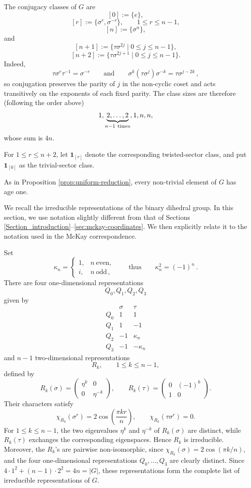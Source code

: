 \documentclass[a4paper,reqno]{amsart}
\theoremstyle{plain} %
\theoremstyle{definition} %
\theoremstyle{remark} %
\newcommand{\ka}{{\kappa}}
\newcommand{\1}{\mathds{1}}   %
\begin{document}
The conjugacy classes of \(G\) are
\[
[0]:=\{e\},
\]
\[
[r]:=\{\sigma^r,\sigma^{-r}\},
\qquad
1\le r\le n-1,
\]
\[
[n]:=\{\sigma^n\},
\]
and
\[
[n+1]
:=
\{\tau\sigma^{2j}\mid 0\le j\le n-1\},
\]
\[
[n+2]
:=
\{\tau\sigma^{2j+1}\mid 0\le j\le n-1\}.
\]
Indeed,
\[
\tau\sigma^r\tau^{-1}=\sigma^{-r}  \qquad \mbox{and} \qquad \sigma^k(\tau\sigma^j)\sigma^{-k}= \tau\sigma^{j-2k} \, ,
\]
so conjugation preserves the parity of \(j\) in the non-cyclic
coset and acts transitively on the exponents of each fixed
parity. The class sizes are therefore (following the  order above)
\[
1,\underbrace{2,\ldots,2}_{n-1\ {\rm times}},1,n,n,
\]
whose sum is \(4n\).

For \(1\le r\le n+2\), let $\mathbf1_{[r]}$ denote the corresponding twisted-sector class, and put $\mathbf1_{[0]}$ as the trivial-sector class.

As in Proposition \ref{prop:uniform-reduction}, every non-trivial element of \(G\) has age one.

We recall the irreducible representations of the binary
dihedral group.
In this section, we use notation slightly different from that of Sections \ref{Section_introduction}--\ref{sec:mckay-coordinates}. 
We then explicitly relate it to the notation used in the McKay correspondence.


Set
\begin{equation}\label{kn}
\ka_n
=
\begin{cases}
1,& n\ \text{even},\\
i,& n\ \text{odd} \, ,
\end{cases}
\qquad \mbox{thus} \qquad \ka_n^2 =(-1)^{n}\, .
\end{equation}
There are four one-dimensional representations
\[
Q_0, Q_1, Q_2, Q_3
\]
given by
\[
\begin{array}{c|cc}
 &\sigma&\tau\\
\hline
Q_0&1&1\\
Q_1&1&-1\\
Q_2&-1&\ka_n\\
Q_3&-1&-\ka_n
\end{array}
\]
and \(n-1\) two-dimensional representations
\[
R_k,
\qquad
1\le k\le n-1,
\]
defined by
\[
R_k(\sigma)
=
\begin{pmatrix}
\eta^{k}&0\\
0&\eta^{-k}
\end{pmatrix},
\qquad
R_k(\tau)
=
\begin{pmatrix}
0&(-1)^{k}\\
1&0
\end{pmatrix}.
\]
Their characters satisfy
\[
\chi_{R_k}(\sigma^r)
=
2\cos\left(\frac{\pi kr}{n}\right),
\qquad
\chi_{R_k}(\tau\sigma^r)=0.
\]
For \(1\le k\le n-1\), the two eigenvalues \(\eta^k\) and \(\eta^{-k}\) of \(R_k(\sigma)\) are distinct, 
while \(R_k(\tau)\) exchanges the corresponding eigenspaces. 
Hence \(R_k\) is irreducible. Moreover, the \(R_k\)'s are pairwise non-isomorphic, 
since \(\chi_{R_k}(\sigma)=2\cos(\pi k/n)\), and the four one-dimensional representations \(Q_0,\ldots,Q_3\) are clearly distinct. 
Since $ 4\cdot1^2+(n-1)\cdot2^2=4n=|G|$,
these representations form the complete list of irreducible representations of \(G\).
\end{document}

